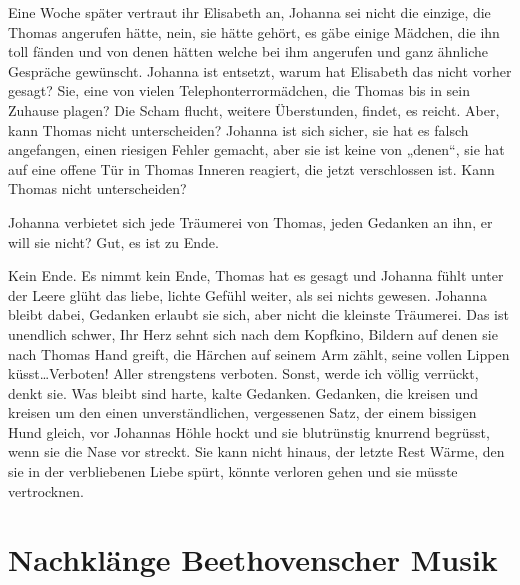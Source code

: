\documentclass[10pt,titlepage,a5paper]{book}
\begin{document}
Eine Woche später vertraut ihr Elisabeth an, Johanna sei nicht die einzige, die Thomas angerufen hätte, nein, sie hätte gehört, es gäbe einige Mädchen, die ihn toll fänden und von denen hätten welche bei ihm angerufen und ganz ähnliche Gespräche gewünscht. Johanna ist entsetzt, warum hat Elisabeth das nicht vorher gesagt? Sie, eine von vielen Telephonterrormädchen, die Thomas bis in sein Zuhause plagen? Die Scham flucht, weitere Überstunden, findet, es reicht. Aber, kann Thomas nicht unterscheiden? Johanna ist sich sicher, sie hat es falsch angefangen, einen riesigen Fehler gemacht, aber sie ist keine von „denen“, sie hat auf eine offene Tür in Thomas Inneren reagiert, die jetzt verschlossen ist. Kann Thomas nicht unterscheiden?

Johanna verbietet sich jede Träumerei von Thomas, jeden Gedanken an ihn, er will sie nicht? Gut, es ist zu Ende.

Kein Ende. Es nimmt kein Ende, Thomas hat es gesagt und Johanna fühlt unter der Leere glüht das liebe, lichte Gefühl weiter, als sei nichts gewesen. Johanna bleibt dabei, Gedanken erlaubt sie sich, aber nicht die kleinste Träumerei. Das ist unendlich schwer, Ihr Herz sehnt sich nach dem Kopfkino, Bildern auf denen sie nach Thomas Hand greift, die Härchen auf seinem Arm zählt, seine vollen Lippen küsst\dots Verboten! Aller strengstens verboten. Sonst, werde ich völlig verrückt, denkt sie.
Was bleibt sind harte, kalte Gedanken. Gedanken, die kreisen und kreisen um den einen unverständlichen, vergessenen Satz, der einem bissigen Hund gleich, vor Johannas Höhle hockt und sie blutrünstig knurrend begrüsst, wenn sie die Nase vor streckt. Sie kann nicht hinaus, der letzte Rest Wärme, den sie in der verbliebenen Liebe spürt, könnte verloren gehen und sie müsste vertrocknen.



\section*{Nachklänge Beethovenscher Musik}
\end{document}
